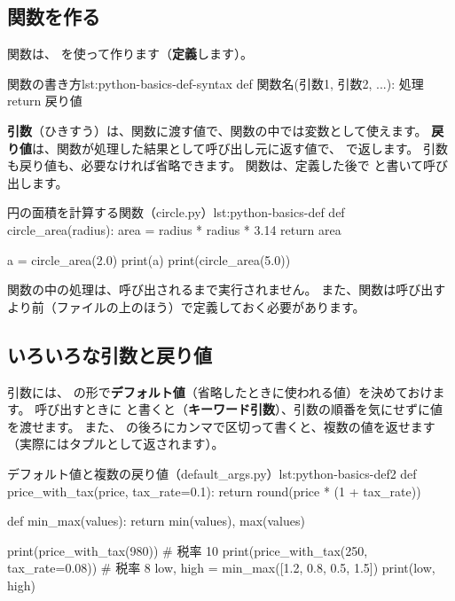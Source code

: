 \subsection{関数を作る}

関数は、 を使って作ります（\textbf{定義}します）。

\begin{codelisting}[style=python]{関数の書き方}{lst:python-basics-def-syntax}
def 関数名(引数1, 引数2, ...):
    処理
    return 戻り値
\end{codelisting}

\textbf{引数}（ひきすう）は、関数に渡す値で、関数の中では変数として使えます。
\textbf{戻り値}は、関数が処理した結果として呼び出し元に返す値で、 で返します。
引数も戻り値も、必要なければ省略できます。
関数は、定義した後で  と書いて呼び出します。

\begin{codelisting}[style=python]{円の面積を計算する関数（circle.py）}{lst:python-basics-def}
def circle_area(radius):
    area = radius * radius * 3.14
    return area


a = circle_area(2.0)
print(a)
print(circle_area(5.0))
\end{codelisting}


関数の中の処理は、呼び出されるまで実行されません。
また、関数は呼び出すより前（ファイルの上のほう）で定義しておく必要があります。

\subsection{いろいろな引数と戻り値}

引数には、 の形で\textbf{デフォルト値}（省略したときに使われる値）を決めておけます。
呼び出すときに  と書くと（\textbf{キーワード引数}）、引数の順番を気にせずに値を渡せます。
また、 の後ろにカンマで区切って書くと、複数の値を返せます（実際にはタプルとして返されます）。

\begin{codelisting}[style=python]{デフォルト値と複数の戻り値（default\_args.py）}{lst:python-basics-def2}
def price_with_tax(price, tax_rate=0.1):
    return round(price * (1 + tax_rate))


def min_max(values):
    return min(values), max(values)


print(price_with_tax(980))                  # 税率 10%
print(price_with_tax(250, tax_rate=0.08))   # 税率 8%
low, high = min_max([1.2, 0.8, 0.5, 1.5])
print(low, high)
\end{codelisting}

